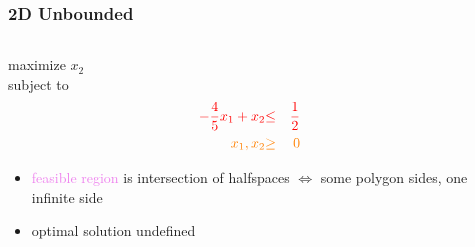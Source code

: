 \documentclass{beamer}
\begin{document}
\begin{frame} \frametitle{2D Unbounded}
  \begin{columns}
    \begin{column}{0.4 \textwidth}
  maximize $x_2$ \\
  subject to
  \begin{eqnarray*}
    \textcolor{red}{-\frac{4}{5} x_1 + x_2} &\textcolor{red}{\leq}& \textcolor{red}{\frac{1}{2}} \\
    \textcolor{orange}{x_1, x_2} &\textcolor{orange}{\geq}& \textcolor{orange}{0}
  \end{eqnarray*}
  \begin{itemize}
    \item \textcolor{violet}{feasible region} is intersection of halfspaces
     $\Leftrightarrow$ some polygon sides, one infinite side
    \item optimal solution undefined
  \end{itemize}
  \end{column}
  \begin{column}{0.6 \textwidth}
    \begin{center}
  \end{center}
\end{column}
\end{columns}
\end{frame}
\end{document}
